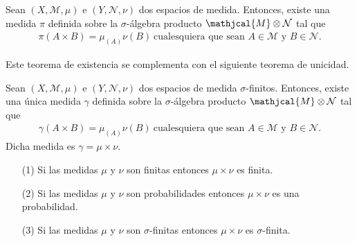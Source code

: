 \begin{teo}
Sean $(X, \mathcal{M}, \mu)$ e $(Y, \mathcal{N}, \nu)$ dos espacios de medida. Entonces, existe una medida $\pi$ definida sobre la $\sigma$-álgebra producto $\mathjcal{M} \otimes \mathcal{N}$ tal que
\begin{align*}
    \pi(A \times B) = \mu_(A)\nu(B) \ \text{cualesquiera que sean } A \in \mathcal{M} \text{ y } B \in \mathcal{N}.
\end{align*}
\end{teo}
Este teorema de existencia se complementa con el siguiente teorema de unicidad.
\begin{teo}
Sean $(X, \mathcal{M}, \mu)$ e $(Y, \mathcal{N}, \nu)$ dos espacios de medida $\sigma$-finitos. Entonces, existe una única medida $\gamma$ definida sobre la $\sigma$-álgebra producto $\mathjcal{M} \otimes \mathcal{N}$ tal que
\begin{align*}
    \gamma(A \times B) = \mu_(A)\nu(B) \ \text{cualesquiera que sean } A \in \mathcal{M} \text{ y } B \in \mathcal{N}.
\end{align*}
Dicha medida es $\gamma = \mu \times \nu$.
\end{teo}

\begin{obs}
\begin{enumerate}
    \item[(1)] Si las medidas $\mu$ y $\nu$ son finitas entonces $\mu \times \nu$ es finita.
    \item[(2)] Si las medidas $\mu$ y $\nu$ son probabilidades entonces $\mu \times \nu$ es una probabilidad.
    \item[(3)] Si las medidas $\mu$ y $\nu$ son $\sigma$-finitas entonces $\mu \times \nu$ es $\sigma$-finita.
\end{enumerate}
\end{obs}

